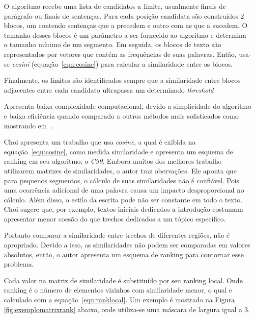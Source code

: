 O algoritmo recebe uma lista de candidatos a limite, usualmente finais de parágrafo ou finais de sentenças. Para cada posição candidata são construídos 2 blocos, um contendo sentenças que a precedem e outro com as que a sucedem. O tamanho desses blocos é um parâmetro a ser fornecido ao algoritmo e determina o tamanho mínimo de um segmento.
%
Em seguida, os blocos de texto são representados por vetores que contém as frequências de suas palavras. Então, usa-se \textit{cosini} (equação~\ref{equ:cosine}) para calcular a similaridade entre os blocos.

Finalmente, os limites são identificados sempre que a similaridade entre blocos adjacentes entre cada candidato ultrapassa um determinado \textit{threshold}

Apresenta baixa complexidade computacional, devido a simplicidade do algoritmo e baixa eficiência quando comparado a outros métodos mais sofisticados como mostrando em~\cite{Choi2000, Kern2009}.








Choi \cite{Choi2000} apresenta um trabalho que usa \textit{cosine}, a qual é exibida na equação~\ref{equ:cosine}, como medida similaridade e apresenta um esquema de ranking em seu algoritmo, o \textit{C99}. 
%
Embora muitos dos melhores trabalho utilizarem matrizes de similaridades, o autor traz obervações.
%
Ele aponta que para pequenos segmentos, o cálculo de suas similaridades não é confiável. Pois uma ocorrência adicional de uma palavra causa um impacto desproporcional no cálculo.
%
Além disso, o estilo da escrita pode não ser constante em todo o texto. Choi sugere que, por exemplo, textos iniciais dedicados a introdução costumam apresentar menor coesão do que trechos dedicados a um tópico específico. 
%

Portanto comparar a similaridade entre trechos de diferentes regiões, não é apropriado.
Devido a isso, as similaridades não podem ser comparadas em valores absolutos,  então, o autor apresenta um esquema de ranking para contornar esse problema.
%



Cada valor na matriz de similaridade é substituído por seu ranking local. Onde ranking é o número de elementos vizinhos com similaridade menor, o qual e calculado com a equação~\ref{equ:ranklocal}. Um exemplo é mostrado na Figura \ref{fig:exemplomatrixrank} abaixo, onde utiliza-se uma máscara de largura igual a 3.



